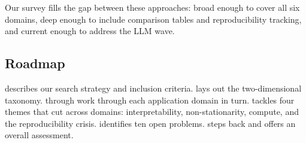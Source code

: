 Our survey fills the gap between these approaches: broad enough to cover all six domains, deep enough to include comparison tables and reproducibility tracking, and current enough to address the LLM wave.

\subsection{Roadmap}

 describes our search strategy and inclusion criteria.  lays out the two-dimensional taxonomy.  through  work through each application domain in turn.  tackles four themes that cut across domains: interpretability, non-stationarity, compute, and the reproducibility crisis.  identifies ten open problems.  steps back and offers an overall assessment.
